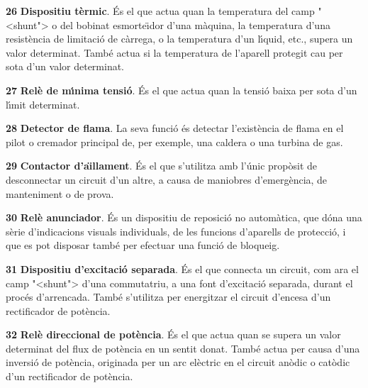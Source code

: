 \begin{multicols}{2}
\begin{list}{}
\item[\textbf{26}]  \textbf{Dispositiu t\`{e}rmic}. \'{E}s el que
actua quan la temperatura del camp {"<}shunt{">} o del bobinat esmorte\"{\i}dor
d'una m\`{a}quina, la temperatura d'una resist\`{e}ncia de limitaci\'{o} de
c\`{a}rrega, o la temperatura d'un l\'{\i}quid, etc., supera un valor
determinat. Tamb\'{e} actua si la temperatura de l'aparell protegit cau
per sota d'un valor determinat.

\item[\textbf{27}]  \textbf{Rel\`{e} de m\'{\i}nima tensi\'{o}}. \'{E}s el que
actua quan la tensi\'{o} baixa per sota d'un l\'{\i}mit determinat.

\item[\textbf{28}]  \textbf{Detector de flama}. La seva funci\'{o} \'{e}s
detectar l'exist\`{e}ncia de flama en el pilot o cremador principal de, per exemple, una
caldera o una turbina de gas.

\item[\textbf{29}]  \textbf{Contactor d'a\"{\i}llament}. \'{E}s el que
s'utilitza amb l'\'{u}nic prop\`{o}sit de desconnectar un circuit d'un
altre,  a  causa de maniobres    d'emerg\`{e}ncia,  de manteniment o de
prova.

\item[\textbf{30}]  \textbf{Rel\`{e} anunciador}. \'{E}s un dispositiu de
reposici\'{o} no autom\`{a}tica, que d\'{o}na una s\`{e}rie d'indicacions visuals
individuals, de les funcions d'aparells de protecci\'{o}, i que es pot
disposar tamb\'{e} per efectuar una funci\'{o} de bloqueig.

\item[\textbf{31}]  \textbf{Dispositiu d'excitaci\'{o}
separada}. \'{E}s el que connecta un circuit, com ara el camp {"<}shunt{">}
d'una commutatriu, a una font d'excitaci\'{o} separada, durant el proc\'{e}s
d'arrencada. Tamb\'{e} s'utilitza per energitzar el circuit d'encesa
d'un rectificador de pot\`{e}ncia.


\item[\textbf{32}]  \textbf{Rel\`{e} direccional de
pot\`{e}ncia}. \'{E}s el que actua quan se supera un valor determinat del
flux de pot\`{e}ncia en un sentit donat. Tamb\'{e} actua per causa d'una
inversi\'{o} de pot\`{e}ncia, originada per un arc el\`{e}ctric en el circuit
an\`{o}dic o cat\`{o}dic d'un rectificador de pot\`{e}ncia.


\end{list}
\end{multicols}

